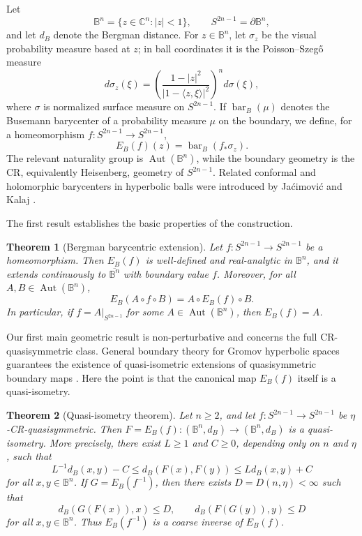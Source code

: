 \documentclass[11pt]{article}
\newtheorem{theorem}{Theorem}[section]
\theoremstyle{definition}
\theoremstyle{remark}
\theoremstyle{definition}
\newcommand{\B}{\mathbb B}
\newcommand{\C}{\mathbb C}
\newcommand{\Aut}{\operatorname{Aut}}
\newcommand{\barB}{\operatorname{bar}_{B}}
\begin{document}
Let
\[
        \B^n=\{z\in\C^n:|z|<1\},
        \qquad S^{2n-1}=\partial\B^n,
\]
and let \(d_B\) denote the Bergman distance.  For \(z\in\B^n\), let
\(\sigma_z\) be the visual probability measure based at \(z\); in ball
coordinates it is the Poisson--Szeg\H{o} measure
\[
        d\sigma_z(\xi)=
        \left(\frac{1-|z|^2}{|1-\langle z,\xi\rangle|^2}\right)^n
        d\sigma(\xi),
\]
where \(\sigma\) is normalized surface measure on \(S^{2n-1}\).  If
\(\barB(\mu)\) denotes the Busemann barycenter of a probability measure
\(\mu\) on the boundary, we define, for a homeomorphism
\(f:S^{2n-1}\to S^{2n-1}\),
\begin{equation}\label{main-extension-intro}
        E_B(f)(z)=\barB(f_*\sigma_z).
\end{equation}
The relevant naturality group is \(\Aut(\B^n)\), while the boundary geometry
is the CR, equivalently Heisenberg, geometry of \(S^{2n-1}\).  Related
conformal and holomorphic barycenters in hyperbolic balls were introduced by
Ja\'cimovi\'c and Kalaj \cite{JacimovicKalaj2025}.

The first result establishes the basic properties of the construction.

\begin{theorem}[Bergman barycentric extension]\label{main-theorem}
Let \(f:S^{2n-1}\to S^{2n-1}\) be a homeomorphism.  Then \(E_B(f)\) is
well-defined and real-analytic in \(\B^n\), and it extends continuously to
\(\overline{\B^n}\) with boundary value \(f\).  Moreover, for all
\(A,B\in\Aut(\B^n)\),
\begin{equation}\label{naturality-main}
        E_B(A\circ f\circ B)=A\circ E_B(f)\circ B.
\end{equation}
In particular, if \(f=A|_{S^{2n-1}}\) for some \(A\in\Aut(\B^n)\), then
\(E_B(f)=A\).
\end{theorem}

Our first main geometric result is non-perturbative and concerns the full
CR-quasisymmetric class.  General boundary theory for Gromov hyperbolic spaces
guarantees the existence of quasi-isometric extensions of quasisymmetric
boundary maps \cite{BonkSchramm}.  Here the point is that the canonical map
\(E_B(f)\) itself is a quasi-isometry.

\begin{theorem}[Quasi-isometry theorem]\label{theorem-general-quasi-isometry}
Let \(n\ge2\), and let
\(f:S^{2n-1}\to S^{2n-1}\) be \(\eta\)-CR-quasisymmetric.  Then
\(F=E_B(f):(\B^n,d_B)\to(\B^n,d_B)\) is a quasi-isometry.  More precisely,
there exist \(L\ge1\) and \(C\ge0\), depending only on \(n\) and \(\eta\),
such that
\begin{equation}\label{general-quasi-isometry-estimate}
        L^{-1}d_B(x,y)-C
        \le d_B(F(x),F(y))
        \le Ld_B(x,y)+C
\end{equation}
for all \(x,y\in\B^n\).  If \(G=E_B(f^{-1})\), then there exists
\(D=D(n,\eta)<\infty\) such that
\begin{equation}\label{coarse-inverse-estimates}
        d_B(G(F(x)),x)\le D,
        \qquad
        d_B(F(G(y)),y)\le D
\end{equation}
for all \(x,y\in\B^n\).  Thus \(E_B(f^{-1})\) is a coarse inverse of
\(E_B(f)\).
\end{theorem}
\end{document}

